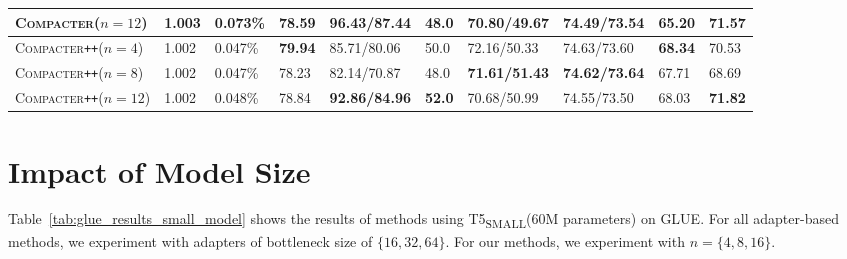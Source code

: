 \documentclass{article}
\newcommand{\basesmall}{T5\textsubscript{\tiny SMALL}\xspace}
\newcommand{\compacter}{\textsc{Compacter}\xspace}
\newcommand{\compacteronlyff}{\textsc{Compacter}\texttt{++}\xspace} %
\newcommand{\glue}{\textsc{GLUE}\xspace}
\begin{document}
\begin{table}[H]
\begin{adjustbox}{max width=\textwidth}
\begin{tabular}{l@{\hskip 0.02in}|l@{\hskip 0.06in}l@{\hskip 0.0in}|l@{\hskip 0.08in}l@{\hskip 0.08in}l@{\hskip 0.08in}l@{\hskip 0.08in}l@{\hskip 0.08in}l@{\hskip 0.08in}|l}
\compacter ($n=12$)&1.003& 0.073\%&  78.59 &  \textbf{96.43/87.44} &            48.0 &        70.80/49.67 &   74.49/73.54       & 65.20 & \textbf{71.57}\\
\midrule 
\compacteronlyff ($n=4$)& 1.002&  0.047\%&       \textbf{79.94} &  85.71/80.06 &            50.0 &       72.16/50.33 &       74.63/73.60 &          \textbf{68.34} &  70.53 \\
\compacteronlyff ($n=8$)& 1.002&  0.047\%&           78.23 &  82.14/70.87 &            48.0 &       \textbf{71.61/51.43} &      \textbf{74.62/73.64} &          67.71 &  68.69 \\
\compacteronlyff ($n=12$)& 1.002&  0.048\%&            78.84 &  \textbf{92.86/84.96} &            \textbf{52.0} &       70.68/50.99 &       74.55/73.50 &          68.03 &  \textbf{71.82} \\
\bottomrule
\end{tabular}
\end{adjustbox}
\label{tab:superglue_all_results} 
\end{table} 


\section{Impact of Model Size} \label{app:model size}
Table~\ref{tab:glue_results_small_model} shows the results of methods using \basesmall (60M parameters) on \glue. For all adapter-based methods, we experiment with adapters of bottleneck size of $\{16, 32, 64\}$. For our methods, we experiment with $n=\{4, 8, 16\}$.
\end{document}
